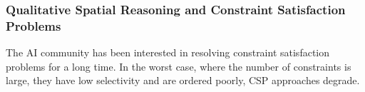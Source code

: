 {    %

    
    }  

\subsubsection{Qualitative Spatial Reasoning and Constraint Satisfaction Problems}
    \par{
    The AI community has been interested in resolving constraint satisfaction problems for a long time.
    In the worst case, where the number of constraints is large, they have low selectivity and are ordered poorly, CSP approaches degrade.}
    
